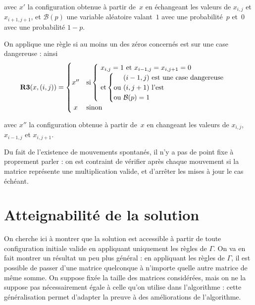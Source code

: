 avec $x'$ la configuration obtenue à partir de~$x$ en échangeant les valeurs de $x_{i,j}$ et $x_{i+1,j+1}$, et $\mathcal{B}(p)$ une variable aléatoire valant~$1$ avec une probabilité~$p$ et~$0$ avec une probabilité $1-p$.

On applique une règle si au moins un des zéros concernés est sur une case dangereuse : ainsi \[
\textbf{R3}(x,(i,j))=
\begin{cases}
  \hfill x'' \hfill & \text {si} \begin{cases}\text{ $x_{i,j}=1$ et $x_{i-1,j}=x_{i,j+1}=0$} \\
    \text{ et} \left\{
        \begin{tabular}{@{}c@{}l}
          &\text{ $(i-1,j)$ est une case dangereuse}\\
          \text {ou}& \text{ $(i,j+1)$ l'est}\\
          \text {ou}& \text{ $\mathcal{B}(p)=1$}\\
        \end{tabular}
      \right.
    \end{cases}
  \\
  \hfill x \hfill & \text {sinon}
\end{cases}
\]

avec $x''$ la configuration obtenue à partir de~$x$ en changeant les valeurs de $x_{i,j}$, $x_{i-1,j}$ et $x_{i,j+1}$.


Du fait de l'existence de mouvements spontanés, il n'y a pas de point fixe à proprement parler : on est contraint de vérifier après chaque mouvement si la matrice représente une multiplication valide, et d'arrêter les mises à jour le cas échéant. 

\section{Atteignabilité de la solution}

On cherche ici à montrer que la solution est accessible à partir de toute configuration initiale valide en appliquant uniquement les règles de $\Gamma$. On va en fait montrer un résultat un peu plus général : en appliquant les règles de $\Gamma$, il est possible de passer d'une matrice quelconque à n'importe quelle autre matrice de même somme. On suppose fixée la taille des matrices considérées, mais on ne la suppose pas nécessairement égale à celle qu'on utilise dans l'algorithme : cette généralisation permet d'adapter la preuve à des améliorations de l'algorithme.

